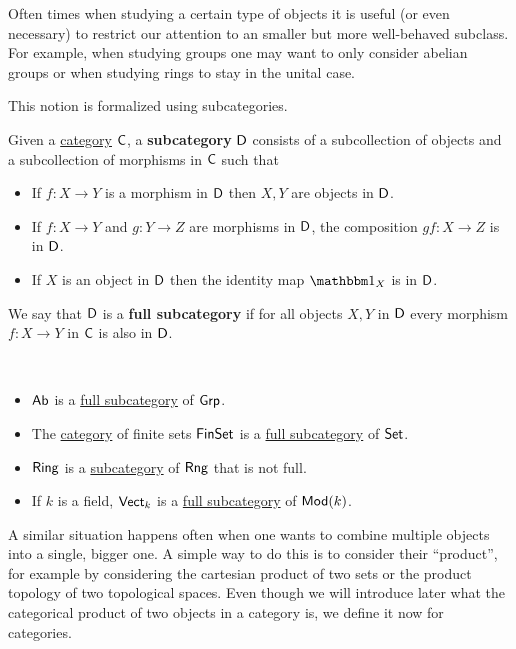 \documentclass[../../main]{subfiles}
\begin{document}
Often times when studying a certain type of objects it is useful (or even necessary) to restrict our attention to an smaller but more well-behaved subclass.
For example, when studying groups one may want to only consider abelian groups or when studying rings to stay in the unital case.

This notion is formalized using subcategories.
\begin{definition}[Subcategory]\label{def:subcategory}
  Given a \hyperref[def:category]{category} \(\mathsf{C}\), a \textbf{subcategory} \(\mathsf{D}\) consists of a subcollection of objects and a subcollection of morphisms in \(\mathsf{C}\) such that
  \begin{itemize}
    \item If \(f\colon X \to Y\) is a morphism in \(\mathsf{D}\) then \(X, Y\) are objects in \(\mathsf{D}\).
    \item If \(f\colon X \to Y\) and \(g\colon Y \to Z\) are morphisms in \(\mathsf{D}\), the composition \(gf\colon X \to Z\) is in \(\mathsf{D}\).
    \item If \(X\) is an object in \(\mathsf{D}\) then the identity map \(\id_{X}\) is in \(\mathsf{D}\).
  \end{itemize}

  We say that \(\mathsf{D}\) is a \textbf{full subcategory} if for all objects \(X, Y\) in \(\mathsf{D}\) every morphism \(f\colon X \to Y\) in \(\mathsf{C}\) is also in \(\mathsf{D}\).
\end{definition}

\begin{example}~
  \begin{itemize}
    \item \(\mathsf{Ab}\) is a \hyperref[def:subcategory]{full subcategory} of \(\mathsf{Grp}\).
    \item The \hyperref[def:category]{category} of finite sets \(\mathsf{FinSet}\) is a \hyperref[def:subcategory]{full subcategory} of \(\mathsf{Set}\).
    \item \(\mathsf{Ring}\) is a \hyperref[def:subcategory]{subcategory} of \(\mathsf{Rng}\) that is not full.
    \item If \(k\) is a field, \(\mathsf{Vect}_{k}\) is a \hyperref[def:subcategory]{full subcategory} of \(\mathsf{Mod}(k)\).
  \end{itemize}
\end{example}

A similar situation happens often when one wants to combine multiple objects into a single, bigger one.
A simple way to do this is to consider their ``product'', for example by considering the cartesian product of two sets or the product topology of two topological spaces.
Even though we will introduce later what the categorical product of two objects in a category is, we define it now for categories.
\end{document}
